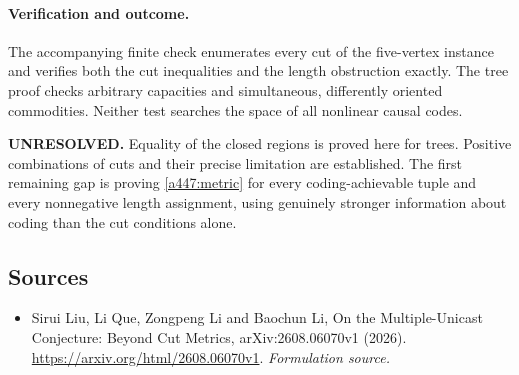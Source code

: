 \documentclass[11pt]{article}
\begin{document}
\paragraph{Verification and outcome.}
The accompanying finite check enumerates every cut of the five-vertex instance and verifies both the cut inequalities and the length obstruction exactly. The tree proof checks arbitrary capacities and simultaneous, differently oriented commodities. Neither test searches the space of all nonlinear causal codes.

\textbf{UNRESOLVED.} Equality of the closed regions is proved here for trees. Positive combinations of cuts and their precise limitation are established. The first remaining gap is proving \eqref{a447:metric} for every coding-achievable tuple and every nonnegative length assignment, using genuinely stronger information about coding than the cut conditions alone.

\subsection{Sources}
\begin{itemize}
\item[S1]Sirui Liu, Li Que, Zongpeng Li and Baochun Li, On the Multiple-Unicast Conjecture: Beyond Cut Metrics, arXiv:2608.06070v1 (2026).
\url{https://arxiv.org/html/2608.06070v1}.
\textit{Formulation source.}
\end{itemize}
\end{document}
